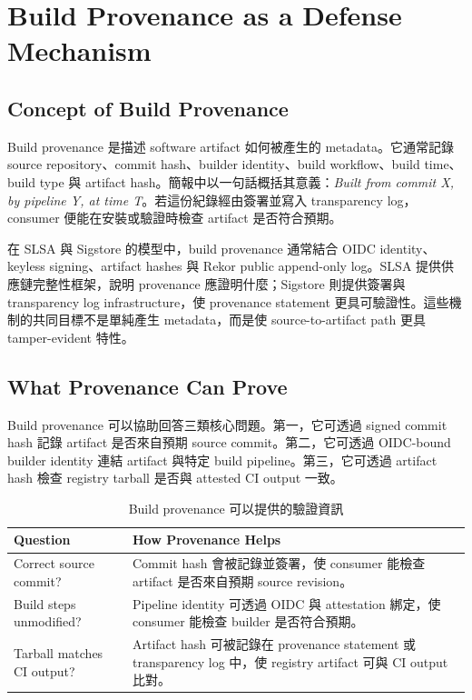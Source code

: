 \documentclass[12pt,a4paper]{article}
\begin{document}
\section{Build Provenance as a Defense Mechanism}

\subsection{Concept of Build Provenance}

Build provenance 是描述 software artifact 如何被產生的 metadata。它通常記錄 source repository、commit hash、builder identity、build workflow、build time、build type 與 artifact hash。簡報中以一句話概括其意義：\textit{Built from commit X, by pipeline Y, at time T}。若這份紀錄經由簽署並寫入 transparency log，consumer 便能在安裝或驗證時檢查 artifact 是否符合預期。

在 SLSA 與 Sigstore 的模型中，build provenance 通常結合 OIDC identity、keyless signing、artifact hashes 與 Rekor public append-only log。SLSA 提供供應鏈完整性框架，說明 provenance 應證明什麼；Sigstore 則提供簽署與 transparency log infrastructure，使 provenance statement 更具可驗證性。這些機制的共同目標不是單純產生 metadata，而是使 source-to-artifact path 更具 tamper-evident 特性。

\subsection{What Provenance Can Prove}

Build provenance 可以協助回答三類核心問題。第一，它可透過 signed commit hash 記錄 artifact 是否來自預期 source commit。第二，它可透過 OIDC-bound builder identity 連結 artifact 與特定 build pipeline。第三，它可透過 artifact hash 檢查 registry tarball 是否與 attested CI output 一致。

\begin{table}[h]
\centering
\caption{Build provenance 可以提供的驗證資訊}
\begin{tabularx}{\textwidth}{P{4.7cm}Y}
\toprule
\textbf{Question} & \textbf{How Provenance Helps} \\
\midrule
Correct source commit? & Commit hash 會被記錄並簽署，使 consumer 能檢查 artifact 是否來自預期 source revision。 \\
Build steps unmodified? & Pipeline identity 可透過 OIDC 與 attestation 綁定，使 consumer 能檢查 builder 是否符合預期。 \\
Tarball matches CI output? & Artifact hash 可被記錄在 provenance statement 或 transparency log 中，使 registry artifact 可與 CI output 比對。 \\
\bottomrule
\end{tabularx}
\end{table}
\end{document}
